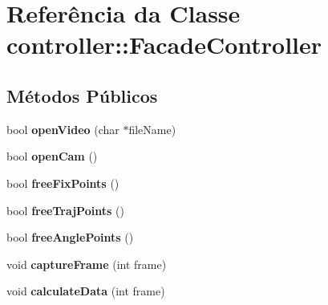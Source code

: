 \hypertarget{classcontroller_1_1FacadeController}{
\section{Referência da Classe controller::FacadeController}
\label{classcontroller_1_1FacadeController}
}
\subsection*{Métodos Públicos}
\begin{DoxyCompactItemize}
\item 
\hypertarget{classcontroller_1_1FacadeController_ae81f0b1634a9ef68fbb494686f41bc47}{
bool {\bfseries openVideo} (char $\ast$fileName)}
\label{classcontroller_1_1FacadeController_ae81f0b1634a9ef68fbb494686f41bc47}

\item 
\hypertarget{classcontroller_1_1FacadeController_a09f651a9faa4911a8c503dea036ec2a0}{
bool {\bfseries openCam} ()}
\label{classcontroller_1_1FacadeController_a09f651a9faa4911a8c503dea036ec2a0}

\item 
\hypertarget{classcontroller_1_1FacadeController_ae55d105dad282a7b6b3eb1ab1c0a029b}{
bool {\bfseries freeFixPoints} ()}
\label{classcontroller_1_1FacadeController_ae55d105dad282a7b6b3eb1ab1c0a029b}

\item 
\hypertarget{classcontroller_1_1FacadeController_a42cf6b38ae4da7a02d3cc431b0285966}{
bool {\bfseries freeTrajPoints} ()}
\label{classcontroller_1_1FacadeController_a42cf6b38ae4da7a02d3cc431b0285966}

\item 
\hypertarget{classcontroller_1_1FacadeController_a90c68e4cb0342788763086db23ac6589}{
bool {\bfseries freeAnglePoints} ()}
\label{classcontroller_1_1FacadeController_a90c68e4cb0342788763086db23ac6589}

\item 
\hypertarget{classcontroller_1_1FacadeController_a36d68b7f0965dc0e83ed8ff8b64d774f}{
void {\bfseries captureFrame} (int frame)}
\label{classcontroller_1_1FacadeController_a36d68b7f0965dc0e83ed8ff8b64d774f}

\item 
\hypertarget{classcontroller_1_1FacadeController_a5cb40e3cbe70514e6d8e7ff8f3040920}{
void {\bfseries calculateData} (int frame)}
\label{classcontroller_1_1FacadeController_a5cb40e3cbe70514e6d8e7ff8f3040920}


\end{DoxyCompactItemize}
